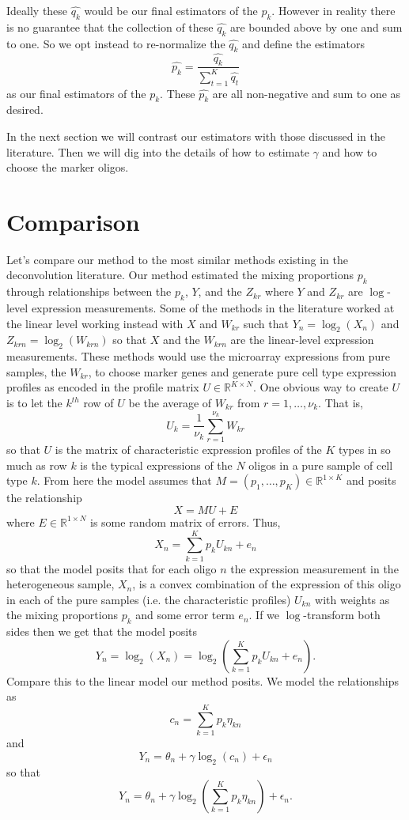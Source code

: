 \documentclass[reqno,12pt,oneside]{report}\usepackage[]{graphicx}\usepackage[]{color}
\theoremstyle{plain}
\theoremstyle{definition}
\theoremstyle{remark}
\numberwithin{theorem}{chapter}     %
\begin{document}
Ideally these $\widehat{q_k}$ would be our final estimators of the $p_k$. However in reality there is no guarantee that the collection of these $\widehat{q_k}$ are bounded above by one and sum to one. So we opt instead to re-normalize the $\widehat{q_k}$ and define the estimators
\[
\widehat{p_k} = \frac{\widehat{q_k}}{\sum_{t=1}^{K}\widehat{q_t}}
\]
as our final estimators of the $p_k$. These $\widehat{p_k}$ are all non-negative and sum to one as desired. 

In the next section we will contrast our estimators with those discussed in the literature. Then we will dig into the details of how to estimate $\gamma$ and how to choose the marker oligos.

\section{Comparison}

Let's compare our method to the most similar methods existing in the deconvolution literature. Our method estimated the mixing proportions $p_k$ through relationships between the $p_k$, $Y$, and the $Z_{kr}$ where $Y$ and $Z_{kr}$ are $\log$-level expression measurements. Some of the methods in the literature worked at the linear level working instead with $X$ and $W_{kr}$ such that $Y_n = \log_2(X_n)$ and $Z_{krn}=\log_2(W_{krn})$ so that $X$ and the $W_{krn}$ are the linear-level expression measurements. These methods would use the microarray expressions from pure samples, the $W_{kr}$, to choose marker genes and generate pure cell type expression profiles as encoded in the profile matrix $U\in\mathbb{R}^{K\times N}$. One obvious way to create $U$ is to let the $k^{th}$ row of $U$ be the average of $W_{kr}$ from $r=1,\ldots,\nu_k$. That is,
\[
U_k = \frac{1}{\nu_k} \sum_{r=1}^{\nu_k}W_{kr}
\]
so that $U$ is the matrix of characteristic expression profiles of the $K$ types in so much as row $k$ is the typical expressions of the $N$ oligos in a pure sample of cell type $k$. 
From here the model assumes that $M=(p_1,\ldots,p_K) \in \mathbb{R}^{1\times K}$ and posits the relationship
\[
X = MU + E
\]
where $E\in\mathbb{R}^{1\times N}$ is some random matrix of errors. Thus, 
\[
X_n = \sum_{k=1}^{K}p_kU_{kn}+e_{n}
\]
so that the model posits that for each oligo $n$ the expression measurement in the heterogeneous sample, $X_n$, is a convex combination of the expression of this oligo in each of the pure samples (i.e. the characteristic profiles) $U_{kn}$ with weights as the mixing proportions $p_k$ and some error term $e_n$. If we $\log$-transform both sides then we get that the model posits
\begin{equation}
\label{eqn:complit}
Y_n = \log_2\left(X_n\right) = \log_2\left(\sum_{k=1}^{K}p_kU_{kn}+e_{n}\right).
\end{equation}
Compare this to the linear model our method posits. We model the relationships as 
\[
c_n = \sum_{k=1}^{K}p_k\eta_{kn}
\]
and 
\[
Y_n = \theta_n + \gamma\log_2\left(c_n\right)+\epsilon_n
\]
so that
\begin{equation}
\label{eqn:compours}
Y_n = \theta_n + \gamma\log_2\left(\sum_{k=1}^{K}p_k\eta_{kn}\right)+\epsilon_n.
\end{equation}
\end{document}
